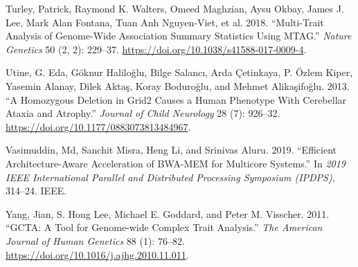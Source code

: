 \documentclass[
]{book}
\newlength{\cslhangindent}
\newlength{\cslentryspacingunit} %
\newenvironment{CSLReferences}[2] %
 {%
  \setlength{\parindent}{0pt}
  \ifodd #1
  \let\oldpar\par
  \def\par{\hangindent=\cslhangindent\oldpar}
  \fi
  \setlength{\parskip}{#2\cslentryspacingunit}
 }%
 {}
\begin{document}
\begin{CSLReferences}{1}{0}
\leavevmode{}%
Turley, Patrick, Raymond K. Walters, Omeed Maghzian, Aysu Okbay, James J. Lee, Mark Alan Fontana, Tuan Anh Nguyen-Viet, et al. 2018. {``Multi-Trait Analysis of Genome-Wide Association Summary Statistics Using {MTAG}.''} \emph{Nature Genetics} 50 (2, 2): 229--37. \url{https://doi.org/10.1038/s41588-017-0009-4}.

\leavevmode{}%
Utine, G. Eda, Göknur Haliloğlu, Bilge Salancı, Arda Çetinkaya, P. Özlem Kiper, Yasemin Alanay, Dilek Aktaş, Koray Boduroğlu, and Mehmet Alikaşifoğlu. 2013. {``A {Homozygous Deletion} in {Grid2 Causes} a {Human Phenotype With Cerebellar Ataxia} and {Atrophy}.''} \emph{Journal of Child Neurology} 28 (7): 926--32. \url{https://doi.org/10.1177/0883073813484967}.

\leavevmode{}%
Vasimuddin, Md, Sanchit Misra, Heng Li, and Srinivas Aluru. 2019. {``Efficient Architecture-Aware Acceleration of {BWA-MEM} for Multicore Systems.''} In \emph{2019 {IEEE International Parallel} and {Distributed Processing Symposium} ({IPDPS})}, 314--24. {IEEE}.

\leavevmode{}%
Yang, Jian, S. Hong Lee, Michael E. Goddard, and Peter M. Visscher. 2011. {``{GCTA}: {A Tool} for {Genome-wide Complex Trait Analysis}.''} \emph{The American Journal of Human Genetics} 88 (1): 76--82. \url{https://doi.org/10.1016/j.ajhg.2010.11.011}.

\end{CSLReferences}
\end{document}

